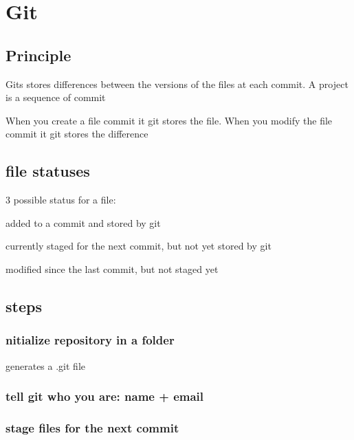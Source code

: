 \chapter{Git}

\section{Principle}

	Gits stores differences between the versions of the files at each commit. A project is a sequence of commit


	When you create a file commit it git stores the file. When you modify the file commit it git stores the difference 



\section{file statuses}

 
 	3 possible status for a file:

	 added to a commit and stored by git

	 currently staged for the next commit, but not yet stored by git

	 modified since the last commit, but not staged yet


\section{steps}

	\subsection{nitialize repository in a folder}
	

		 generates a .git file 

	\subsection{tell git who you are: name + email}
	
	

	\subsection{stage files for the next commit}

